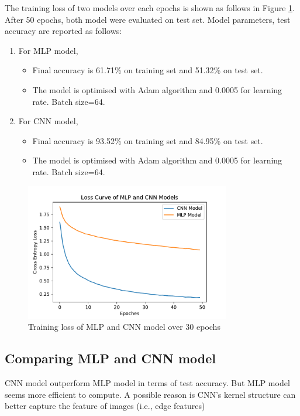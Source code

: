 \documentclass[12pt,letterpaper]{article}
\begin{document}
The training loss of two models over each epochs is shown as follows in Figure \ref{fig:loss_curve_mlp_cnn}.
After 50 epochs, both model were evaluated on test set. Model parameters, test accuracy are reported as follows:
\begin{enumerate}
	\item For MLP model, \begin{itemize}
		\item Final accuracy is 61.71\% on training set and 51.32\% on test set.
		\item The model is optimised with Adam algorithm and 0.0005 for learning rate. Batch size=64.
	\end{itemize}
	\item For CNN model, \begin{itemize}
		\item Final accuracy is 93.52\% on training set and 84.95\% on test set.
		\item The model is optimised with Adam algorithm and 0.0005 for learning rate. Batch size=64.
	\end{itemize}
	
\end{enumerate}

\begin{figure}[h]
	\centering
	\includegraphics[width=0.8\textwidth]{Loss_Curve_MLP_CNN}
	\caption{Training loss of MLP and CNN model over 30 epochs}
	\label{fig:loss_curve_mlp_cnn}
\end{figure}

\subsection*{Comparing MLP and CNN model}
CNN model outperform MLP model in terms of test accuracy. But MLP model seems more efficient to compute. A possible reason is CNN's kernel structure can better capture the feature of images (i.e., edge features)
\end{document}
